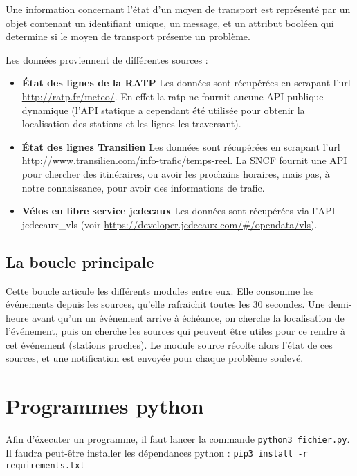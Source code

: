 \documentclass[a4paper, 8pt]{article}
\begin{document}
Une information concernant l'état d'un moyen de transport est représenté par un
objet contenant un identifiant unique, un message, et un attribut booléen qui
determine si le moyen de transport présente un problème.

Les données proviennent de différentes sources :
\begin{itemize}
  \item \textbf{État des lignes de la RATP} Les données sont récupérées en scrapant l'url
  \url{http://ratp.fr/meteo/}.
  En effet la ratp ne fournit aucune API publique dynamique (l'API statique a
  cependant été utilisée pour obtenir la localisation des stations et les lignes
  les traversant).

  \item \textbf{État des lignes Transilien} Les données sont récupérées en scrapant l'url \url{http://www.transilien.com/info-trafic/temps-reel}.
  La SNCF fournit une API pour chercher des itinéraires, ou avoir les prochains
  horaires, mais pas, à notre connaissance, pour avoir des informations de trafic.

  \item \textbf{Vélos en libre service jcdecaux} Les données sont récupérées via
  l'API jcdecaux\_vls (voir \url{https://developer.jcdecaux.com/#/opendata/vls}).
\end{itemize}

\subsection{La boucle principale}

Cette boucle articule les différents modules entre eux.
Elle consomme les événements depuis les sources, qu'elle rafraichit toutes les
$30$ secondes.
Une demi-heure avant qu'un un événement arrive à échéance, on cherche la
localisation de l'événement, puis on cherche les sources qui peuvent être utiles
pour ce rendre à cet événement (stations proches).
Le module source récolte alors l'état de ces sources, et une notification est
envoyée pour chaque problème soulevé.


\section{Programmes python}

Afin d'éxecuter un programme, il faut lancer la commande
\texttt{python3 fichier.py}.
Il faudra peut-être installer les dépendances python :
\texttt{pip3 install -r requirements.txt}
\end{document}
